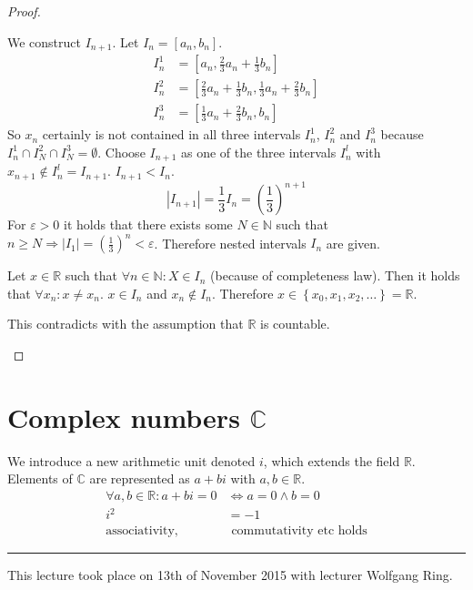 \documentclass[a4paper,landscape,twocolumn]{article}
\newcommand\set[1]{\left\{#1\right\}}
\newcommand\abs[1]{\left|#1\right|}
\newcommand\meta[3]{\hrule{} This #1 took place on #2 with lecturer #3.\par}
\begin{document}
\begin{proof}
\begin{description}
      We construct $I_{n+1}$. Let $I_n = [a_n, b_n]$.
      \begin{align*}
        I_n^1 &= \left[a_n, \frac23 a_n + \frac13 b_n\right] \\
        I_n^2 &= \left[\frac23 a_n + \frac13 b_n, \frac13 a_n + \frac23 b_n\right] \\
        I_n^3 &= \left[\frac13 a_n + \frac23 b_n, b_n\right]
      \end{align*}
      So $x_n$ certainly is not contained in all three intervals $I_n^1$, $I_n^2$
      and $I_n^3$ because $I_n^1 \cap I_N^2 \cap I_N^3 = \emptyset$.
      Choose $I_{n+1}$ as one of the three intervals $I_n^l$ with $x_{n+1} \not\in I_n^l = I_{n+1}$.
      $I_{n+1} < I_n$.
      \[ \abs{I_{n+1}} = \frac13 I_{n} = \left(\frac13\right)^{n+1} \]
      For $\varepsilon > 0$ it holds that there exists some $N \in \mathbb N$
      such that $n \geq N \Rightarrow \abs{I_1} = \left(\frac13\right)^n < \varepsilon$.
      Therefore nested intervals $I_n$ are given.

      Let $x \in \mathbb R$ such that $\forall n \in \mathbb N: X \in I_n$
      (because of completeness law). Then it holds that $\forall x_n: x \neq x_n$.
      $x \in I_n$ and $x_n \not\in I_n$.
      Therefore $x \in \set{x_0, x_1, x_2, \ldots} = \mathbb R$.

      This contradicts with the assumption that $\mathbb R$ is countable.
  \end{description}
\end{proof}

\section[Complex numbers]{Complex numbers $\mathbb C$}

We introduce a new arithmetic unit denoted $i$, which extends the field $\mathbb R$.
Elements of $\mathbb C$ are represented as $a + bi$ with $a,b \in \mathbb R$.
\begin{align}
  \forall a, b \in \mathbb R: a + bi = 0 &\Leftrightarrow a = 0 \land b = 0 \\
  i^2 &= -1 \\
  \text{associativity,} & \text{ commutativity etc holds}
\end{align}

\meta{lecture}{13th of November 2015}{Wolfgang Ring}
\end{document}
